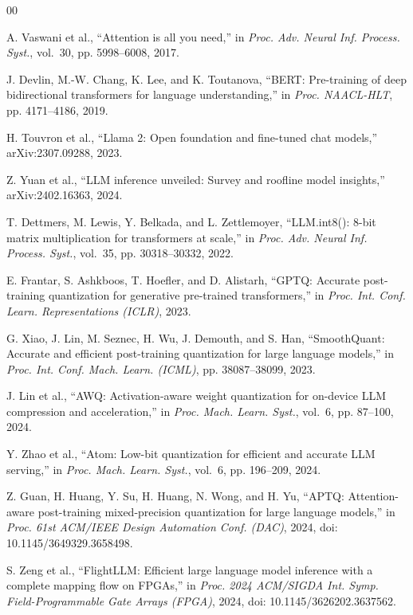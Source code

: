 \documentclass[conference]{IEEEtran}
\begin{document}
\begin{thebibliography}{00}

A. Vaswani et al., ``Attention is all you need,'' in \emph{Proc. Adv. Neural
Inf. Process. Syst.}, vol.~30, pp. 5998--6008, 2017.

J. Devlin, M.-W. Chang, K. Lee, and K. Toutanova, ``BERT: Pre-training of deep
bidirectional transformers for language understanding,'' in \emph{Proc.
NAACL-HLT}, pp. 4171--4186, 2019.

H. Touvron et al., ``Llama 2: Open foundation and fine-tuned chat models,''
arXiv:2307.09288, 2023.

Z. Yuan et al., ``LLM inference unveiled: Survey and roofline model
insights,'' arXiv:2402.16363, 2024.

T. Dettmers, M. Lewis, Y. Belkada, and L. Zettlemoyer, ``LLM.int8(): 8-bit matrix
multiplication for transformers at scale,'' in \emph{Proc. Adv. Neural Inf.
Process. Syst.}, vol.~35, pp. 30318--30332, 2022.

E. Frantar, S. Ashkboos, T. Hoefler, and D. Alistarh, ``GPTQ: Accurate
post-training quantization for generative pre-trained transformers,'' in
\emph{Proc. Int. Conf. Learn. Representations (ICLR)}, 2023.

G. Xiao, J. Lin, M. Seznec, H. Wu, J. Demouth, and S. Han, ``SmoothQuant:
Accurate and efficient post-training quantization for large language models,''
in \emph{Proc. Int. Conf. Mach. Learn. (ICML)}, pp. 38087--38099, 2023.

J. Lin et al., ``AWQ: Activation-aware weight quantization for on-device LLM
compression and acceleration,'' in \emph{Proc. Mach. Learn. Syst.}, vol.~6,
pp. 87--100, 2024.

Y. Zhao et al., ``Atom: Low-bit quantization for efficient and accurate LLM
serving,'' in \emph{Proc. Mach. Learn. Syst.}, vol.~6, pp. 196--209, 2024.

Z. Guan, H. Huang, Y. Su, H. Huang, N. Wong, and H. Yu,
``APTQ: Attention-aware post-training mixed-precision quantization for large
language models,'' in \emph{Proc. 61st ACM/IEEE Design Automation Conf.
(DAC)}, 2024, doi: 10.1145/3649329.3658498.

S. Zeng et al., ``FlightLLM: Efficient large language model inference with a
complete mapping flow on FPGAs,'' in \emph{Proc. 2024 ACM/SIGDA Int. Symp.
Field-Programmable Gate Arrays (FPGA)}, 2024,
doi: 10.1145/3626202.3637562.


\end{thebibliography}
\end{document}
